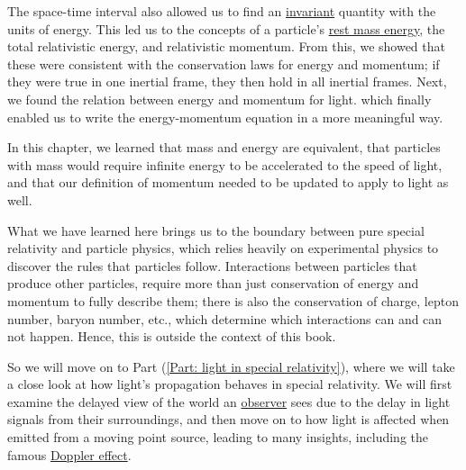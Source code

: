 The space-time interval also allowed us to find an \hyperlink{def-lorentz-invariant}{invariant} quantity with the units of energy.
This led us to the concepts of a particle's \hyperlink{def-rest-mass-energy}{rest mass energy}, the total relativistic energy, and relativistic momentum.
From this, we showed that these were consistent with the conservation laws for energy and momentum; if they were true in one inertial frame, they then hold in all inertial frames.
Next, we found the relation between energy and momentum for light.
which finally enabled us to write the energy-momentum equation in a more meaningful way.

In this chapter, we learned that mass and energy are equivalent, that particles with mass would require infinite energy to be accelerated to the speed of light, and that our definition of momentum needed to be updated to apply to light as well.

What we have learned here brings us to the boundary between pure special relativity and particle physics, which relies heavily on experimental physics to discover the rules that particles follow.
Interactions between particles that produce other particles, require more than just conservation of energy and momentum to fully describe them; there is also the conservation of charge, lepton number, baryon number, etc., which determine which interactions can and can not happen.
Hence, this is outside the context of this book.

So we will move on to Part (\ref{Part: light in special relativity}), where we will take a close look at how light's propagation behaves in special relativity.
We will first examine the delayed view of the world an \hyperlink{def-observer}{observer} sees due to the delay in light signals from their surroundings, and then move on to how light is affected when emitted from a moving point source, leading to many insights, including the famous \hyperlink{def-doppler-effect}{Doppler effect}.


